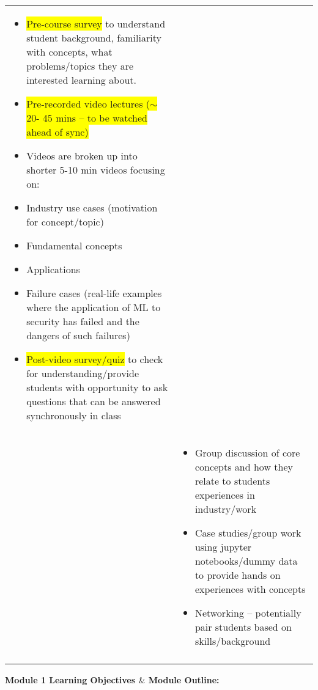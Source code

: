 \documentclass[12pt]{article}
\renewcommand{\_}{\kern-1.5pt\textunderscore\kern-1.5pt}
\begin{document}
\begin{table}[H]
\begin{tabular}{p{1.1in}p{5.0in}}
{\begin{itemize}
	\item \colorbox{Yellow}{Pre-course survey} to understand student background, familiarity with concepts, what problems/topics they are interested learning about.  \par 	\item \colorbox{Yellow}{Pre-recorded video lectures\textbf{ }($ \sim $  20- 45 mins -- to be watched ahead of sync)} \par 	\item Videos are broken up into shorter 5-10 min videos focusing on:  \par 	\item Industry use cases (motivation for concept/topic) \par 	\item Fundamental concepts  \par 	\item Applications \par 	\item Failure cases (real-life examples where the application of ML to security has failed and the dangers of such failures) \par 	\item \colorbox{Yellow}{Post-video survey/quiz} to check for understanding/provide students with opportunity to ask questions that can be answered synchronously in class 
\end{itemize}} \\
\hhline{--}
\multicolumn{1}{|p{1.1in}}{\textbf{Synchronous Content: }} & 
\multicolumn{1}{|p{5.0in}|}{\begin{itemize}
	\item Group discussion of core concepts and how they relate to students experiences in industry/work \par 	\item Case studies/group work using jupyter notebooks/dummy data to provide hands on experiences with concepts  \par 	\item Networking -- potentially pair students based on skills/background 
\end{itemize}} \\
\hhline{--}

\end{tabular}
 \end{table}




\vspace{\baselineskip}
\textbf{Module 1 Learning Objectives $\&$  Module Outline: }\par
\end{document}
